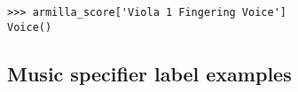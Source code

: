 \begin{comment}
<abjad>
armilla_score['Viola 1 Fingering Voice']
</abjad>
\end{comment}

\begin{singlespacing}
\vspace{-0.5\baselineskip}
\begin{lstlisting}
>>> armilla_score['Viola 1 Fingering Voice']
Voice()
\end{lstlisting}
\end{singlespacing}

\subsection{Music specifier label examples}

\begin{comment}
<abjad>
unlabeled_music_specifier = consort.MusicSpecifier()
labeled_music_specifier = consort.MusicSpecifier(labels=['labeled'])
timespan_inventory = timespantools.TimespanInventory([
    consort.PerformedTimespan(
        layer=1,
        start_offset=0,
        stop_offset=4,
        music_specifier=labeled_music_specifier,
        voice_name='Voice 1',
        ),
    consort.PerformedTimespan(
        layer=1,
        start_offset=2,
        stop_offset=7,
        music_specifier=labeled_music_specifier,
        voice_name='Voice 2',
        ),
    consort.PerformedTimespan(
        layer=2,
        start_offset=6,
        stop_offset=8,
        music_specifier=unlabeled_music_specifier,
        voice_name='Voice 1',
        ),
    consort.PerformedTimespan(
        layer=2,
        start_offset=10,
        stop_offset=(25, 2),
        music_specifier=unlabeled_music_specifier,
        voice_name='Voice 2',
        ),
    consort.PerformedTimespan(
        layer=1,
        start_offset=11,
        stop_offset=14,
        music_specifier=labeled_music_specifier,
        voice_name='Voice 1',
        ),
    consort.PerformedTimespan(
        layer=1,
        start_offset=14,
        stop_offset=16,
        music_specifier=labeled_music_specifier,
        voice_name='Voice 1',
        ),
    consort.PerformedTimespan(
        layer=1,
        start_offset=15,
        stop_offset=16,
        music_specifier=labeled_music_specifier,
        voice_name='Voice 2',
        ),
    ])
show(timespan_inventory, key='voice_name')
</abjad>
\end{comment}

